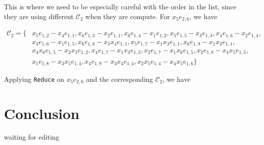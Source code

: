 \documentclass{article}
\theoremstyle{definition}
\theoremstyle{remark}
\theoremstyle{example}
\begin{document}
This is where we need to be especially careful with the order in the list, since they are using different $\mathcal{C}_2$ when they are compute. For $x_5e_{2,6}$, we have

\begin{equation}
    \begin{aligned}
        \mathcal{C}_2 = \{&x_5e_{1,2}-x_4e_{1,1},x_6e_{1,3}-x_2e_{1,1},x_6e_{1,4}-x_1e_{1,2},x_5e_{1,5}-x_3e_{1,3},x_4e_{1,6}-x_2e_{1,4},\\
        & x_3e_{1,6}-x_1e_{1,5},x_6e_{1,8}-x_3x_4e_{1,1},x_5e_{1,7}-x_1x_3e_{1,1},x_6e_{1,9}-x_1x_3e_{1,1},\\
        & x_4x_6e_{1,5}-x_2x_3e_{1,2},x_4e_{1,7}-x_1x_3e_{1,2},x_2e_{1,7}-x_1x_6e_{1,5},x_2e_{1,8}-x_4x_5e_{1,5},\\
        & x_1e_{1,8}-x_3x_5e_{1,4},x_4e_{1,9}-x_3x_4e_{1,4},x_2x_5e_{1,4}-x_4x_5e_{1,6}\}
    \end{aligned}
\end{equation}

Applying \verb+Reduce+ on $x_5e_{2,6}$ and the corresponding $\mathcal{C}_2$, we have 
    
\section{Conclusion}

\paragraph{  }

\textcolor{BrickRed}{waiting for editing}

\newpage
\printbibliography
\end{document}
